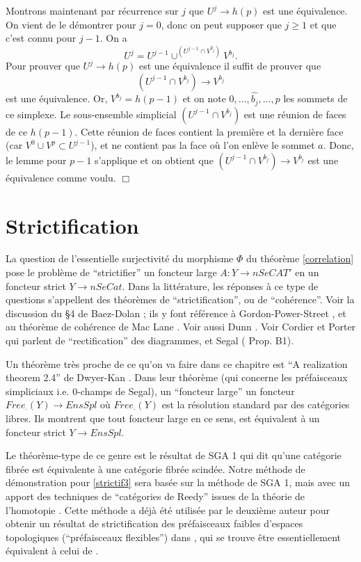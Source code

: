 \documentclass[12pt]{article}
\newcommand{\numero}[1]{\newpage\section{#1}}
\newcommand{\eop}{\hfill $\Box$\vspace{.1in}}
\begin{document}
Montrons maintenant par r\'ecurrence sur $j$ que $U^j\rightarrow h(p)$ est
une \'equivalence. On vient de le d\'emontrer pour $j=0$, donc on peut supposer
que $j\geq 1$ et que c'est connu pour $j-1$. On a
$$
U^j = U^{j-1} \cup ^{(U^{j-1}\cap V^{b_j})}V^{b_j}.
$$
Pour prouver que $U^j\rightarrow h(p)$ est une \'equivalence il suffit de
prouver que
$$
(U^{j-1}\cap V^{b_j})\rightarrow V^{b_j}
$$
est une \'equivalence. Or, $V^{b_j} = h(p-1)$ et on note
$0,\ldots , \widehat{b_j}, \ldots , p$
les sommets de ce simplexe. Le sous-ensemble simplicial
$(U^{j-1}\cap V^{b_j})$ est une r\'eunion de faces de ce $h(p-1)$. Cette
r\'eunion
de faces contient la premi\`ere et la derni\`ere face (car $V^0\cup V^p\subset
U^{j-1}$), et ne contient pas la face o\`u l'on enl\`eve le sommet $a$. Donc, le
lemme pour $p-1$ s'applique et on obtient que
$(U^{j-1}\cap V^{b_j})\rightarrow V^{b_j}$ est une \'equivalence comme voulu.
\eop





\numero{Strictification}

\label{strictpage}

La question de l'essentielle surjectivit\'e du morphisme $\Phi$ du
th\'eor\`eme \ref{correlation}
pose le probl\`eme de ``strictifier'' un foncteur large $A: Y \rightarrow
nSeCAT'$ en un foncteur strict $Y \rightarrow nSeCat$. Dans la litt\'erature,
les r\'eponses \`a ce type de questions s'appellent des th\'eor\`emes de
``strictification'', ou de ``coh\'erence''.
Voir la discussion du \S 4 de Baez-Dolan \cite{BaezDolan};
ils y font r\'ef\'erence \`a Gordon-Power-Street \cite{Gordon-Power-Street},
et au th\'eor\`eme de coh\'erence de Mac Lane \cite{MacLane2}.
Voir aussi Dunn \cite{Dunn97}. 
Voir Cordier et Porter \cite{CordierPorter2} \cite{CordierPorter3}
qui parlent de ``rectification'' des diagrammes, et Segal
(\cite{SegalTopology} Prop. B1).

Un th\'eor\`eme tr\`es proche de ce qu'on va faire dans ce chapitre est
``A realization theorem 2.4'' de Dwyer-Kan \cite{DwyerKanDiags}.
Dans leur th\'eor\`eme (qui concerne les pr\'efaisceaux simpliciaux i.e.
$0$-champs de Segal), un ``foncteur large'' un foncteur
$Free _{\cdot}(Y)\rightarrow EnsSpl$ o\`u $Free_{\cdot}(Y)$ est la
r\'esolution standard par
des cat\'egories libres. Ils montrent que tout foncteur
large en ce sens, est \'equivalent \`a un foncteur strict $Y\rightarrow
EnsSpl$.

Le th\'eor\`eme-type de ce genre est le r\'esultat de SGA 1 \cite{SGA1}
qui dit qu'une cat\'egorie fibr\'ee est \'equivalente \`a une cat\'egorie
fibr\'ee scind\'ee. Notre m\'ethode de d\'emonstration
pour \ref{strictif3} sera
bas\'ee sur la m\'ethode de SGA 1, mais avec un apport des techniques de
``cat\'egories de Reedy'' issues de la th\'eorie de l'homotopie \cite{Reedy}
\cite{BousfieldKan} \cite{Hirschhorn} \cite{DHK} \cite{DwyerKanDiags}.
Cette m\'ethode a d\'ej\`a \'et\'e utilis\'ee par le deuxi\`eme auteur
pour obtenir un r\'esultat de strictification
des pr\'efaisceaux faibles d'espaces
topologiques (``pr\'efaisceaux flexibles'') dans \cite{flexible},
qui se trouve \^etre essentiellement \'equivalent \`a celui de
\cite{DwyerKanDiags}.
\end{document}
